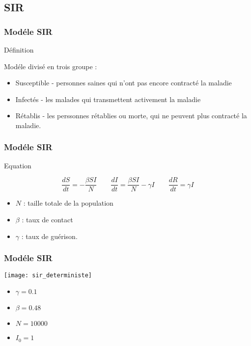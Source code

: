 \subsection{SIR}

\begin{frame}
        \frametitle{Modéle SIR}

        \begin{block}{Définition}

                Modéle divisé en trois groupe :
                \begin{itemize}
                        \item Susceptible - personnes saines qui n'ont pas encore contracté la maladie
                        \item Infectés - les malades qui transmettent activement la maladie
                        \item Rétablis - les perssonnes rétablies ou morte, qui ne peuvent plus contracté la maladie.
                \end{itemize}

        \end{block}
\end{frame}

\begin{frame}
        \frametitle{Modéle SIR}

        \begin{alertblock}{Equation}

                $$ \frac{dS}{dt} = -\frac{\beta SI}{N} \qquad \frac{dI}{dt} = \frac{\beta SI}{N} - \gamma I \qquad \frac{dR}{dt} = \gamma I $$

                \begin{itemize}
                        \item $N$ : taille totale de la population
                        \item $\beta$ : taux de contact
                        \item $\gamma$ : taux de guérison.
                \end{itemize}

        \end{alertblock}
\end{frame}

\begin{frame}
        \frametitle{Modéle SIR}

        \centering
        \texttt{[image: sir\_deterministe]}

        \begin{multicols}{2}
                \begin{itemize}
                        \item $\gamma = 0.1$
                        \item $\beta = 0.48$
                        \item $N = 10000$
                        \item $I_0 = 1$
                \end{itemize}
        \end{multicols}

\end{frame}

